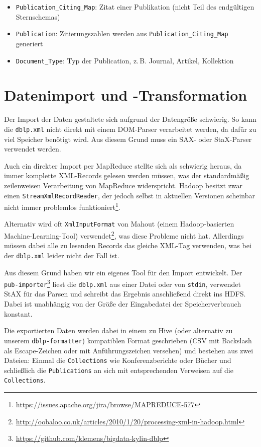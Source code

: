 \documentclass[a4paper,11pt,utf8]{scrartcl}
\begin{document}
\begin{itemize}
    \item \texttt{Publication\_Citing\_Map}: Zitat einer Publikation (nicht Teil des endgültigen Sternschemas)
    \item \texttt{Publication}: Zitierungszahlen werden aus \texttt{Publication\_Citing\_Map} generiert
    \item \texttt{Document\_Type}: Typ der Publication, z.\,B. Journal, Artikel, Kollektion
\end{itemize}

\section{Datenimport und -Transformation}

Der Import der Daten gestaltete sich aufgrund der Datengröße schwierig. So kann die \texttt{dblp.xml} nicht direkt mit einem DOM-Parser verarbeitet werden, da dafür zu viel Speicher benötigt wird. Aus diesem Grund muss ein SAX- oder StaX-Parser verwendet werden.

Auch ein direkter Import per MapReduce stellte sich als schwierig heraus, da immer komplette XML-Records gelesen werden müssen, was der standardmäßig zeilenweisen Verarbeitung von MapReduce widerspricht. Hadoop besitzt zwar einen \texttt{StreamXmlRecordReader}, der jedoch selbst in aktuellen Versionen scheinbar nicht immer problemlos funktioniert\footnote{\url{https://issues.apache.org/jira/browse/MAPREDUCE-577}}.

Alternativ wird oft \texttt{XmlInputFormat} von Mahout (einem Hadoop-basierten Machine-Learning-Tool) verwendet\footnote{\url{http://oobaloo.co.uk/articles/2010/1/20/processing-xml-in-hadoop.html}}, was diese Probleme nicht hat. Allerdings müssen dabei alle zu lesenden Records das gleiche XML-Tag verwenden, was bei der \texttt{dblp.xml} leider nicht der Fall ist.

Aus diesem Grund haben wir ein eigenes Tool für den Import entwickelt. Der \texttt{pub-importer}\footnote{\url{https://github.com/klemens/bigdata-kylin-dblp}} liest die \texttt{dblp.xml} aus einer Datei oder von \texttt{stdin}, verwendet StAX für das Parsen und schreibt das Ergebnis anschließend direkt ins HDFS. Dabei ist unabhängig von der Größe der Eingabedatei der Speicherverbrauch konstant.

Die exportierten Daten werden dabei in einem zu Hive (oder alternativ zu unserem \texttt{dblp-formatter}) kompatiblen Format geschrieben (CSV mit Backslash als Escape-Zeichen oder mit Anführungszeichen versehen) und bestehen aus zwei Dateien: Einmal die \texttt{Collections} wie Konferenzberichte oder Bücher und schließlich die \texttt{Publications} an sich mit entsprechenden Verweisen auf die \texttt{Collections}.
\end{document}
